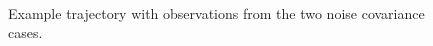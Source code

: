 \documentclass[10pt,twocolumn,twoside]{IEEEtran}
\begin{document}
\begin{figure}[!t]
\centering
{}
\\
\caption{Example trajectory with observations from the two noise covariance cases.}
\label{fig:example_trajectories}
\end{figure}
\end{document}
